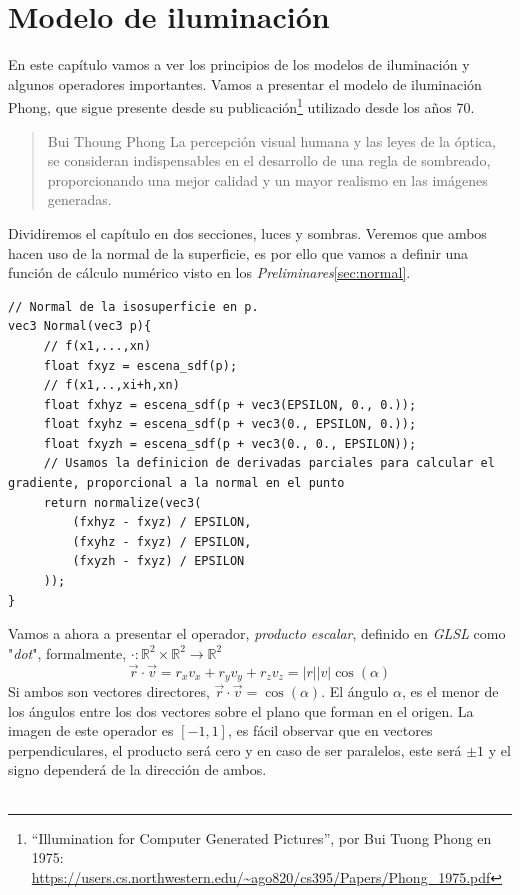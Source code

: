 \chapter{Modelo de iluminación\label{ch:iluminacion}}
En este capítulo vamos a ver los principios de los modelos de iluminación y algunos operadores importantes. Vamos a presentar el modelo de iluminación Phong, que sigue presente desde su publicación\footnote{\enquote{Illumination for Computer Generated Pictures}, por Bui Tuong Phong  en 1975: \url{https://users.cs.northwestern.edu/~ago820/cs395/Papers/Phong_1975.pdf}}  utilizado desde los años 70.
\begin{quote}{Bui Thoung Phong}
    La percepción visual humana y las leyes de la óptica, se consideran indispensables en el desarrollo de una regla de sombreado, proporcionando una mejor calidad y un mayor realismo en las imágenes generadas.
\end{quote}
Dividiremos el capítulo en dos secciones, luces y sombras. Veremos que ambos hacen uso de la normal de la superficie, es por ello que vamos a definir una función de cálculo numérico visto en los \textit{Preliminares}\ref{sec:normal}.
\begin{lstlisting}
// Normal de la isosuperficie en p.
vec3 Normal(vec3 p){
     // f(x1,...,xn)
     float fxyz = escena_sdf(p);
     // f(x1,..,xi+h,xn)
     float fxhyz = escena_sdf(p + vec3(EPSILON, 0., 0.));
     float fxyhz = escena_sdf(p + vec3(0., EPSILON, 0.));
     float fxyzh = escena_sdf(p + vec3(0., 0., EPSILON));
     // Usamos la definicion de derivadas parciales para calcular el gradiente, proporcional a la normal en el punto
     return normalize(vec3(
         (fxhyz - fxyz) / EPSILON,
         (fxyhz - fxyz) / EPSILON,
         (fxyzh - fxyz) / EPSILON
     ));
}
\end{lstlisting}
\newpage
Vamos a ahora a presentar el operador, \textit{producto escalar},
definido en \textit{GLSL} como "\textit{dot}", formalmente, \(\cdot :\mathbb{R}^2\times\mathbb{R}^2\longrightarrow \mathbb{R}^2\) 
\[\Vec{r} \cdot  \Vec{v} = r_xv_x + r_yv_y + r_zv_z = \vert r\vert\vert v\vert\cos(\alpha)\]
Si ambos son vectores directores, \(\Vec{r} \cdot \Vec{v} = \cos(\alpha)\). El ángulo \(\alpha\), es el menor de los ángulos entre los dos vectores sobre el plano que forman en el origen. La imagen de este operador es \([-1,1]\), es fácil observar que en vectores perpendiculares, el producto será cero y en caso de ser paralelos, este será \(\pm 1\) y el signo dependerá de la dirección de ambos.\\\\ 
